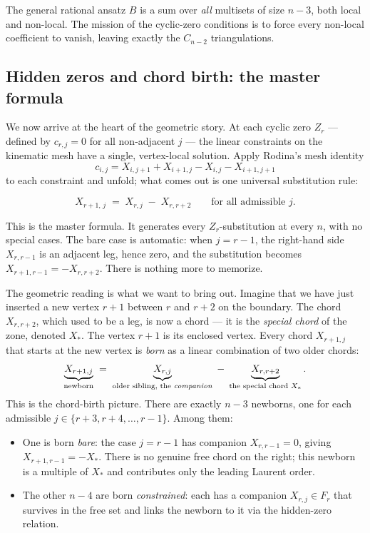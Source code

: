\documentclass[11pt]{article}
\theoremstyle{definition}
\begin{document}
\noindent
The general rational ansatz $B$ is a sum over \emph{all} multisets of size $n-3$, both local and non-local. The mission of the cyclic-zero conditions is to force every non-local coefficient to vanish, leaving exactly the $C_{n-2}$ triangulations.

\subsection{Hidden zeros and chord birth: the master formula} \label{sec:masterformula}

We now arrive at the heart of the geometric story. At each cyclic zero $Z_r$ --- defined by $c_{r,j}=0$ for all non-adjacent $j$ --- the linear constraints on the kinematic mesh have a single, vertex-local solution. Apply Rodina's mesh identity
\[
c_{i,j} = X_{i,j+1} + X_{i+1,j} - X_{i,j} - X_{i+1,j+1}
\]
to each constraint and unfold; what comes out is one universal substitution rule:

\begin{equation}
\boxed{
\quad X_{r+1,\,j} \;=\; X_{r,j} \;-\; X_{r,r+2} \qquad \text{for all admissible $j$.}\quad
}
\label{eq:masterformula}
\end{equation}

This is the master formula. It generates every $Z_r$-substitution at every $n$, with no special cases. The bare case is automatic: when $j = r-1$, the right-hand side $X_{r,r-1}$ is an adjacent leg, hence zero, and the substitution becomes $X_{r+1,r-1} = -X_{r,r+2}$. There is nothing more to memorize.

The geometric reading is what we want to bring out. Imagine that we have just inserted a new vertex $r+1$ between $r$ and $r+2$ on the boundary. The chord $X_{r,r+2}$, which used to be a leg, is now a chord --- it is the \emph{special chord} of the zone, denoted $X_*$. The vertex $r+1$ is its enclosed vertex. Every chord $X_{r+1,j}$ that starts at the new vertex is \emph{born} as a linear combination of two older chords:
\[
\underbrace{X_{r+1,j}}_{\text{newborn}} \;=\; \underbrace{X_{r,j}}_{\text{older sibling, the \emph{companion}}} \;-\; \underbrace{X_{r,r+2}}_{\text{the special chord }X_*}.
\]
This is the chord-birth picture. There are exactly $n-3$ newborns, one for each admissible $j \in \{r+3, r+4, \dots, r-1\}$. Among them:

\begin{itemize}
  \item One is born \emph{bare}: the case $j = r-1$ has companion $X_{r,r-1}=0$, giving $X_{r+1,r-1} = -X_*$. There is no genuine free chord on the right; this newborn is a multiple of $X_*$ and contributes only the leading Laurent order.
  \item The other $n-4$ are born \emph{constrained}: each has a companion $X_{r,j} \in F_r$ that survives in the free set and links the newborn to it via the hidden-zero relation.
\end{itemize}
\end{document}

